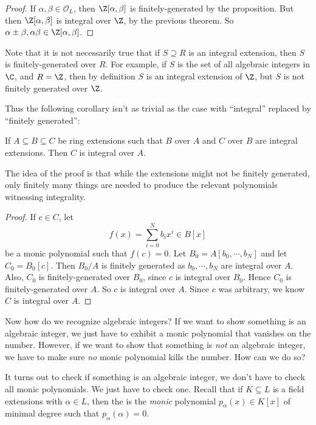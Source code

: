 \documentclass[a4paper]{article}
\begin{document}
\begin{proof}
  If $\alpha, \beta \in \mathcal{O}_L$, then $\Z[\alpha, \beta]$ is finitely-generated by the proposition. But then $\Z[\alpha, \beta]$ is integral over $\Z$, by the previous theorem. So $\alpha \pm \beta, \alpha\beta \in \Z[\alpha, \beta]$.
\end{proof}

Note that it is not necessarily true that if $S \supseteq R$ is an integral extension, then $S$ is finitely-generated over $R$. For example, if $S$ is the set of all algebraic integers in $\C$, and $R = \Z$, then by definition $S$ is an integral extension of $\Z$, but $S$ is not finitely generated over $\Z$.

Thus the following corollary isn't as trivial as the case with ``integral'' replaced by ``finitely generated'':
\begin{cor}
  If $A \subseteq B \subseteq C$ be ring extensions such that $B$ over $A$ and $C$ over $B$ are integral extensions. Then $C$ is integral over $A$.
\end{cor}

The idea of the proof is that while the extensions might not be finitely generated, only finitely many things are needed to produce the relevant polynomials witnessing integrality.

\begin{proof}
  If $c \in C$, let
  \[
    f(x) = \sum_{i = 0}^N b_i x^i \in B[x]
  \]
  be a monic polynomial such that $f(c) = 0$. Let $B_0 = A[b_0, \cdots, b_N]$ and let $C_0 = B_0[c]$. Then $B_0/A$ is finitely generated as $b_0, \cdots, b_N$ are integral over $A$. Also, $C_0$ is finitely-generated over $B_0$, since $c$ is integral over $B_0$. Hence $C_0$ is finitely-generated over $A$. So $c$ is integral over $A$. Since $c$ was arbitrary, we know $C$ is integral over $A$.
\end{proof}

Now how do we recognize algebraic integers? If we want to show something is an algebraic integer, we just have to exhibit a monic polynomial that vanishes on the number. However, if we want to show that something is \emph{not} an algebraic integer, we have to make sure \emph{no} monic polynomial kills the number. How can we do so?

It turns out to check if something is an algebraic integer, we don't have to check all monic polynomials. We just have to check one. Recall that if $K \subseteq L$ is a field extensions with $\alpha \in L$, then the  is the \emph{monic} polynomial $p_\alpha(x) \in K[x]$ of minimal degree such that $p_\alpha(\alpha) = 0$.
\end{document}
